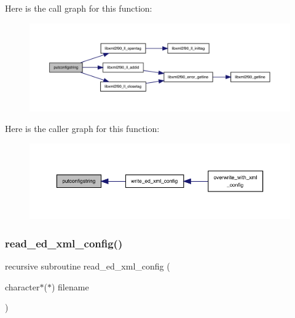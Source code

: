 Here is the call graph for this function\+:
\nopagebreak
\begin{figure}[H]
\begin{center}
\leavevmode
\includegraphics[width=350pt]{ed__xml__config_8f90_aac9f776b36e63aa8454d3841e3fda182_cgraph}
\end{center}
\end{figure}
Here is the caller graph for this function\+:
\nopagebreak
\begin{figure}[H]
\begin{center}
\leavevmode
\includegraphics[width=350pt]{ed__xml__config_8f90_aac9f776b36e63aa8454d3841e3fda182_icgraph}
\end{center}
\end{figure}
\mbox{\label{ed__xml__config_8f90_accb60513f4c46e691fcd1f96c1e9df36}} 
\subsubsection{\texorpdfstring{read\+\_\+ed\+\_\+xml\+\_\+config()}{read\_ed\_xml\_config()}}
{\footnotesize\ttfamily recursive subroutine read\+\_\+ed\+\_\+xml\+\_\+config (\begin{DoxyParamCaption}\item[{character$\ast$($\ast$)}]{filename }\end{DoxyParamCaption})}

